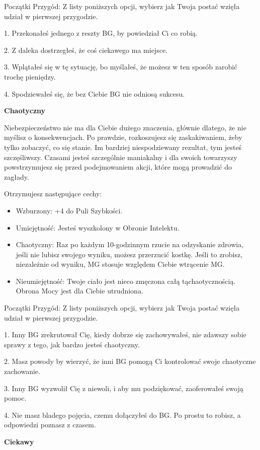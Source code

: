 Początki Przygód: Z listy poniższych opcji, wybierz jak Twoja postać wzięła udział w pierwszej przygodzie.

1. Przekonałeś jednego z reszty BG, by powiedział Ci co robią.

2. Z daleka dostrzegłeś, że coś ciekawego ma miejsce.

3. Wplątałeś się w tę sytuację, bo myślałeś, że możesz w ten sposób zarobić trochę pieniędzy.

4. Spodziewałeś się, że bez Ciebie BG nie odniosą sukcesu.

\textbf{Chaotyczny}

Niebezpieczeństwo nie ma dla Ciebie dużego znaczenia, głównie dlatego, że nie myślisz o konsekwencjach. Po prawdzie, rozkoszujesz się zaskakiwaniem, żeby tylko zobaczyć, co się stanie. Im bardziej niespodziewany rezultat, tym jesteś szczęśliwszy. Czasami jesteś szczególnie maniakalny i dla swoich towarzyszy powstrzymujesz się przed podejmowaniem akcji, które mogą prowadzić do zagłady. 

Otrzymujesz następujące cechy:
\begin{itemize}
 \item Wzburzony: +4 do Puli Szybkości.
 \item Umiejętność: Jesteś wyszkolony w Obronie Intelektu.
 \item Chaotyczny: Raz po każdym 10-godzinnym rzucie na odzyskanie zdrowia, jeśli nie lubisz swojego wyniku, możesz przerzucić kostkę. Jeśli to zrobisz, niezależnie od wyniku, MG stosuje względem Ciebie wtrącenie MG.
\item Nieumiejętność: Twoje ciało jest nieco zmęczona całą tąchaotycznością. Obrona Mocy jest dla Ciebie utrudniona.
\end{itemize}

Początki Przygód: Z listy poniższych opcji, wybierz jak Twoja postać wzięła udział w pierwszej przygodzie.

1. Inny BG zrekrutował Cię, kiedy dobrze się zachowywałeś, nie zdawszy sobie sprawy z tego, jak bardzo jesteś chaotyczny.

2. Masz powody by wierzyć, że inni BG pomogą Ci kontrolować swoje chaotyczne zachowanie.

3. Inny BG wyzwolił Cię z niewoli, i aby mu podziękować, zaoferowałeś swoją pomoc.

4. Nie masz bladego pojęcia, czemu dołączyłeś do BG. Po prostu to robisz, a odpowiedzi poznasz z czasem.

\textbf{Ciekawy}

